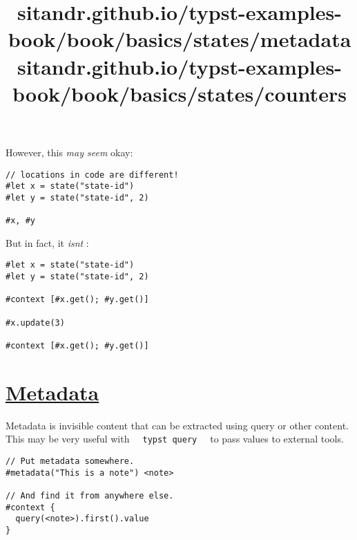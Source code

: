 \pandocbounded{}

However, this \emph{may seem} okay:

\begin{verbatim}
// locations in code are different!
#let x = state("state-id")
#let y = state("state-id", 2)

#x, #y
\end{verbatim}

\pandocbounded{}

But in fact, it \emph{isn\textquotesingle t} :

\begin{verbatim}
#let x = state("state-id")
#let y = state("state-id", 2)

#context [#x.get(); #y.get()]

#x.update(3)

#context [#x.get(); #y.get()]
\end{verbatim}

\pandocbounded{}


\title{sitandr.github.io/typst-examples-book/book/basics/states/metadata}

\section{\texorpdfstring{\hyperref[metadata]{Metadata}}{Metadata}}\label{metadata}

Metadata is invisible content that can be extracted using query or other
content. This may be very useful with
\texttt{\ }{\texttt{\ typst\ query\ }}\texttt{\ } to pass values to
external tools.

\begin{verbatim}
// Put metadata somewhere.
#metadata("This is a note") <note>

// And find it from anywhere else.
#context {
  query(<note>).first().value
}
\end{verbatim}

\pandocbounded{}


\title{sitandr.github.io/typst-examples-book/book/basics/states/counters}

